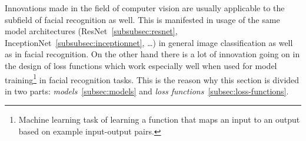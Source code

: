 Innovations made in the field of computer vision are usually applicable to the subfield of facial recognition as well.
This is manifested in usage of the same model architectures (ResNet~\ref{subsubsec:resnet},
InceptionNet~\ref{subsubsec:inceptionnet}, \ldots) in general image classification as well as in facial recognition.
On the other hand there is a lot of innovation going on in the design of loss functions which work especially well
when used for model training\footnote{Machine learning task of learning a function that maps an input to an output
based on example input-output pairs.} in facial recognition tasks.
This is the reason why this section is divided in two parts: \textit{models}~\ref{subsec:models} and
\textit{loss functions}~\ref{subsec:loss-functions}.


